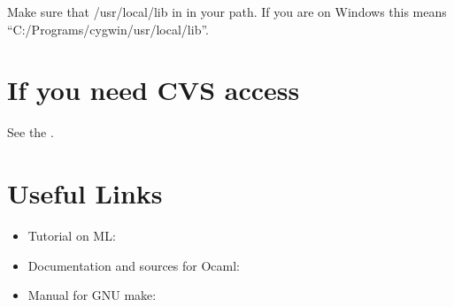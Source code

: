 \documentclass{article}
\begin{document}
 Make sure that /usr/local/lib in in your path. If you are on Windows this
 means ``C:/Programs/cygwin/usr/local/lib''. 


\section{If you need CVS access} 

 See the .


\section{Useful Links}
\begin{itemize}
 \item  Tutorial on ML: 
  \item Documentation and sources for Ocaml: 
  \item Manual for GNU make:

    
 \end{itemize}
\end{document}

